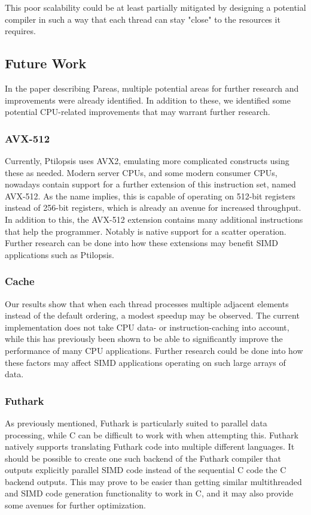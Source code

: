 \documentclass[11pt,dvipsnames]{article}
\newcommand{\Rplus}{\protect\hspace{-.1em}\protect\raisebox{.35ex}{\smaller{\smaller\textbf{+}}}}
\newcommand{\Cpp}{\mbox{C\Rplus\Rplus}\xspace}
\begin{document}
This poor scalability could be at least partially mitigated by designing a potential compiler in such a way that each thread can stay "close" to the resources it requires.

\subsection{Future Work}
In the paper describing Pareas, multiple potential areas for further research and improvements were already identified. In addition to these, we identified some potential CPU-related improvements that may warrant further research.

\subsubsection*{AVX-512} \label{avx512}
Currently, Ptilopsis uses AVX2, emulating more complicated constructs using these as needed. Modern server CPUs, and some modern consumer CPUs, nowadays contain support for a further extension of this instruction set, named AVX-512. As the name implies, this is capable of operating on 512-bit registers instead of 256-bit registers, which is already an avenue for increased throughput. In addition to this, the AVX-512 extension contains many additional instructions that help the programmer. Notably is native support for a scatter operation. Further research can be done into how these extensions may benefit SIMD applications such as Ptilopsis.

\subsubsection*{Cache}
Our results show that when each thread processes multiple adjacent elements instead of the default ordering, a modest speedup may be observed. The current implementation does not take CPU data- or instruction-caching into account, while this has previously been shown to be able to significantly improve the performance of many CPU applications. Further research could be done into how these factors may affect SIMD applications operating on such large arrays of data.

\newpage

\subsubsection*{Futhark}
As previously mentioned, Futhark is particularly suited to parallel data processing, while \Cpp can be difficult to work with when attempting this. Futhark natively supports translating Futhark code into multiple different languages. It should be possible to create one such backend of the Futhark compiler that outputs explicitly parallel SIMD code instead of the sequential C code the C backend outputs. This may prove to be easier than getting similar multithreaded and SIMD code generation functionality to work in \Cpp, and it may also provide some avenues for further optimization.
\end{document}
